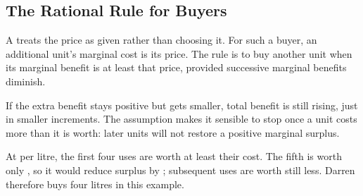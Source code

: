 \subsection{The Rational Rule for Buyers}
A  treats the price as given rather than choosing it.
For such a buyer, an additional unit's marginal cost is its price.
The rule is to buy another unit when its marginal benefit is at least that
price, provided successive marginal benefits diminish.

If the extra benefit stays positive but gets smaller, total benefit is
still rising, just in smaller increments. The assumption makes it sensible
to stop once a unit costs more than it is worth: later units will not
restore a positive marginal surplus.

At  per litre, the first four uses are worth at least their
cost. The fifth is worth only , so it would reduce surplus
by ; subsequent uses are worth still less. Darren therefore
buys four litres in this example.

